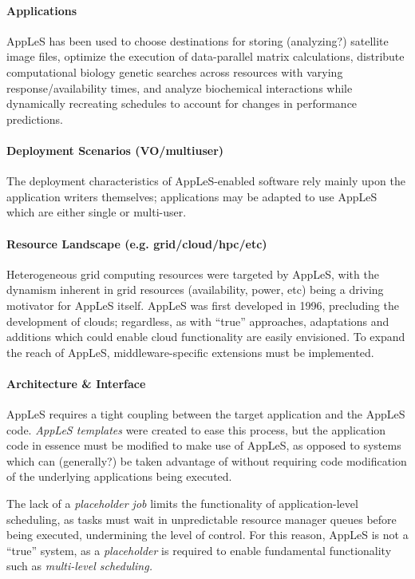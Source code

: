 \documentclass{sig-alternate}
\begin{document}
\paragraph{Applications}
AppLeS has been used to choose destinations
for storing (analyzing?)
satellite image files, optimize the execution of data-parallel matrix
calculations, distribute computational biology genetic searches 
across resources with varying response/availability times, and
analyze biochemical interactions while dynamically recreating
schedules to account for changes in performance predictions.

\paragraph{Deployment Scenarios (VO/multiuser)}
The deployment characteristics of AppLeS-enabled software rely
mainly upon the application writers themselves; applications
may be adapted to use AppLeS which are either single or multi-user.

\paragraph{Resource Landscape (e.g. grid/cloud/hpc/etc)}
Heterogeneous grid computing resources were targeted by
AppLeS, with the dynamism inherent in grid resources (availability,
power, etc) being a driving motivator for AppLeS itself.  AppLeS
was first developed in 1996, precluding the development of clouds;
regardless, as with ``true'' \pilotjob approaches, adaptations
and additions which could enable cloud functionality are easily
envisioned.  To expand the reach of AppLeS, middleware-specific
extensions must be implemented. 

\paragraph{Architecture \& Interface}
AppLeS requires a tight coupling between the target application
and the AppLeS code.  \textit{AppLeS templates} were created
to ease this process, but the application code in essence must
be modified to make use of AppLeS, as opposed to \pilotjob
systems which can (generally?) be taken advantage of without
requiring code modification of the underlying applications being
executed.

The lack of a \textit{placeholder job} limits the functionality 
of application-level scheduling, as tasks
must wait in unpredictable resource manager queues before being executed,
undermining the level of control.  For this reason, AppLeS
is not a ``true'' \pilotjob system, as a \textit{placeholder}
is required to enable fundamental \pilotjob functionality such as
\textit{multi-level scheduling.}
\end{document}
